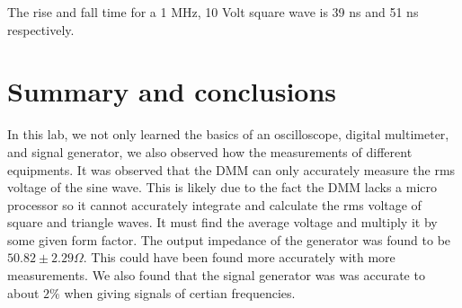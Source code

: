 \documentclass[11pt,letterpaper,onecolumn]{article}
\begin{document}
The rise and fall time for a 1 MHz, 10 Volt square wave is 39 ns and 51 ns respectively. 

\section{Summary and conclusions}

In this lab, we not only learned the basics of an oscilloscope, digital multimeter, and signal generator, we also observed how the measurements of different equipments. It was observed that the DMM can only accurately measure the rms voltage of the sine wave. This is likely due to the fact the DMM lacks a micro processor so it cannot accurately integrate and calculate the rms voltage of square and triangle waves. It must find the average voltage and multiply it by some given form factor. The output impedance of the generator was found to be $50.82\pm2.29\Omega$. This could have been found more accurately with more measurements. We also found that the signal generator was was accurate to about $2\%$ when giving signals of certian frequencies.





\end{document}
